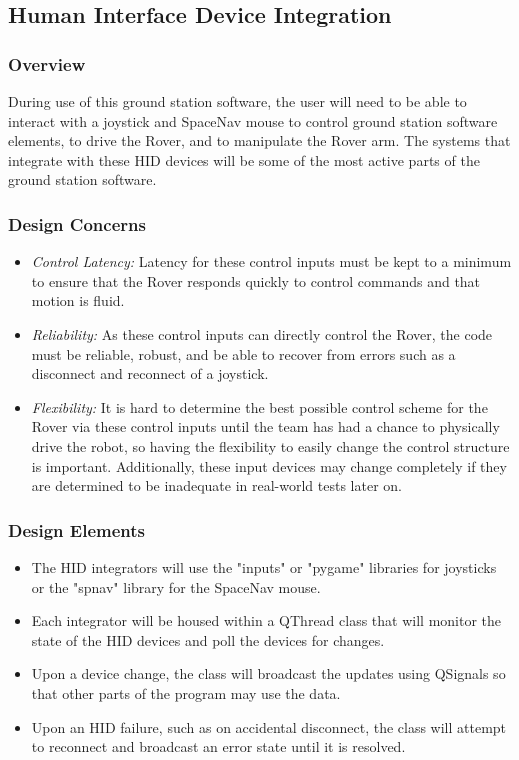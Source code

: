 \subsection{Human Interface Device Integration}
\subsubsection{Overview}
During use of this ground station software, the user will need to be able to interact with a joystick and SpaceNav mouse to control ground station software elements, to drive the Rover, and to manipulate the Rover arm.
The systems that integrate with these HID devices will be some of the most active parts of the ground station software.

\subsubsection{Design Concerns}
\begin{itemize}
\item \textit{Control Latency:} Latency for these control inputs must be kept to a minimum to ensure that the Rover responds quickly to control commands and that motion is fluid.
\item \textit{Reliability:} As these control inputs can directly control the Rover, the code must be reliable, robust, and be able to recover from errors such as a disconnect and reconnect of a joystick.
\item \textit{Flexibility:} It is hard to determine the best possible control scheme for the Rover via these control inputs until the team has had a chance to physically drive the robot, so having the flexibility to easily change the control structure is important.
Additionally, these input devices may change completely if they are determined to be inadequate in real-world tests later on.
\end{itemize}

\subsubsection{Design Elements}
\begin{itemize}
\item The HID integrators will use the "inputs" or "pygame" libraries for joysticks or the "spnav" library for the SpaceNav mouse.
\item Each integrator will be housed within a QThread class that will monitor the state of the HID devices and poll the devices for changes.
\item Upon a device change, the class will broadcast the updates using QSignals so that other parts of the program may use the data.
\item Upon an HID failure, such as on accidental disconnect, the class will attempt to reconnect and broadcast an error state until it is resolved.
\end{itemize}

